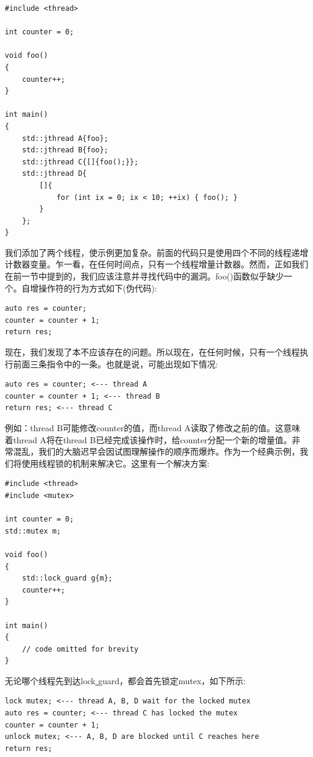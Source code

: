 \begin{lstlisting}[caption={}]
#include <thread>

int counter = 0;

void foo()
{
	counter++;
}

int main()
{
	std::jthread A{foo};
	std::jthread B{foo};
	std::jthread C{[]{foo();}};
	std::jthread D{
		[]{
			for (int ix = 0; ix < 10; ++ix) { foo(); }
		}
	};
}
\end{lstlisting}

我们添加了两个线程，使示例更加复杂。前面的代码只是使用四个不同的线程递增计数器变量。乍一看，在任何时间点，只有一个线程增量计数器。然而，正如我们在前一节中提到的，我们应该注意并寻找代码中的漏洞。foo()函数似乎缺少一个。自增操作符的行为方式如下(伪代码): \par

\begin{lstlisting}[caption={}]
auto res = counter;
counter = counter + 1;
return res;
\end{lstlisting}

现在，我们发现了本不应该存在的问题。所以现在，在任何时候，只有一个线程执行前面三条指令中的一条。也就是说，可能出现如下情况: \par

\begin{lstlisting}[caption={}]
auto res = counter; <--- thread A
counter = counter + 1; <--- thread B
return res; <--- thread C
\end{lstlisting}

例如：thread B可能修改counter的值，而thread A读取了修改之前的值。这意味着thread A将在thread B已经完成该操作时，给counter分配一个新的增量值。非常混乱，我们的大脑迟早会因试图理解操作的顺序而爆炸。作为一个经典示例，我们将使用线程锁的机制来解决它。这里有一个解决方案: \par

\begin{lstlisting}[caption={}]
#include <thread>
#include <mutex>

int counter = 0;
std::mutex m;

void foo()
{
	std::lock_guard g{m};
	counter++;
}

int main()
{
	// code omitted for brevity
}
\end{lstlisting}

无论哪个线程先到达lock\underline{ }guard，都会首先锁定mutex，如下所示: \par

\begin{lstlisting}[caption={}]
lock mutex; <--- thread A, B, D wait for the locked mutex
auto res = counter; <--- thread C has locked the mutex
counter = counter + 1;
unlock mutex; <--- A, B, D are blocked until C reaches here
return res;
\end{lstlisting}

